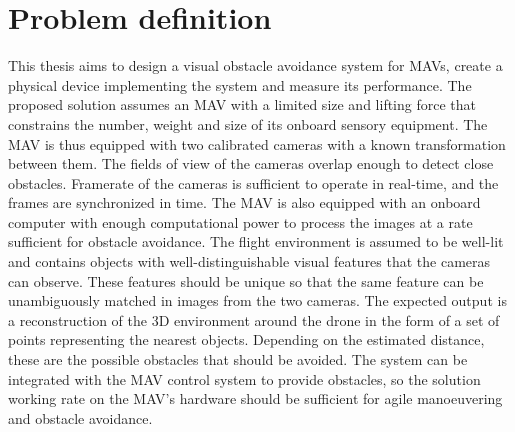 \section{Problem definition}
\label{sec:problem_definition}
This thesis aims to design a visual obstacle avoidance system for MAVs, create a physical device implementing the system and measure its performance. 
The proposed solution assumes an MAV with a limited size and lifting force that constrains the number, weight and size of its onboard sensory equipment. 
The MAV is thus equipped with two calibrated cameras with a known transformation between them. 
The fields of view of the cameras overlap enough to detect close obstacles.
Framerate of the cameras is sufficient to operate in real-time, and the frames are synchronized in time.
The MAV is also equipped with an onboard computer with enough computational power to process the images at a rate sufficient for obstacle avoidance.
The flight environment is assumed to be well-lit and contains objects with well-distinguishable visual features that the cameras can observe.
These features should be unique so that the same feature can be unambiguously matched in images from the two cameras.
The expected output is a reconstruction of the 3D environment around the drone in the form of a set of points representing the nearest objects.
Depending on the estimated distance, these are the possible obstacles that should be avoided.
The system can be integrated with the MAV control system to provide obstacles, so the solution working rate on the MAV's hardware should be sufficient for agile manoeuvering and obstacle avoidance.

